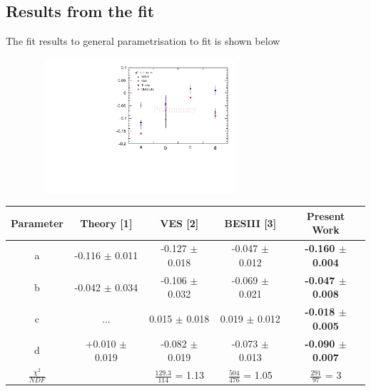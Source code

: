\subsection{Results from the fit}
The fit results to general parametrisation to fit is shown below

 
\begin{center}
\includegraphics[width=10cm,height=5cm]{fit.pdf}
\end{center}

\begin{table}[!htb]
\centering
\begin{tabular}{|c|c|c|c|c|}
\hline
Parameter & {Theory [1]}           & VES [2]              & BESIII [3]          & { \textbf{Present Work}}   \\
\hline
a         & {-0.116 $\pm$ 0.011} & -0.127 $\pm$ 0.018 & -0.047 $\pm$ 0.012 & { \textbf{-0.160 $\pm$ 0.004}} \\
b         & {-0.042 $\pm$ 0.034} & -0.106 $\pm$ 0.032 & -0.069 $\pm$ 0.021 & { \textbf{-0.047 $\pm$ 0.008}} \\
c         & {...}              &{ 0.015 $\pm$ 0.018}  &{ 0.019 $\pm$ 0.012} & { \textbf{ -0.018 $\pm$ 0.005}} \\
d         & {+0.010 $\pm$ 0.019} & -0.082 $\pm$ 0.019 & -0.073 $\pm$ 0.013 & { \textbf{-0.090 $\pm$ 0.007}}  \\
\hline
$\frac{\chi^{2}}{NDF}$      &                                         & $\frac{129.3}{114}$ = 1.13                 & $\frac{504}{476}$ = 1.05                 & {$\frac{291}{97}$ = 3} \\
\hline
\end{tabular}
\end{table} 

